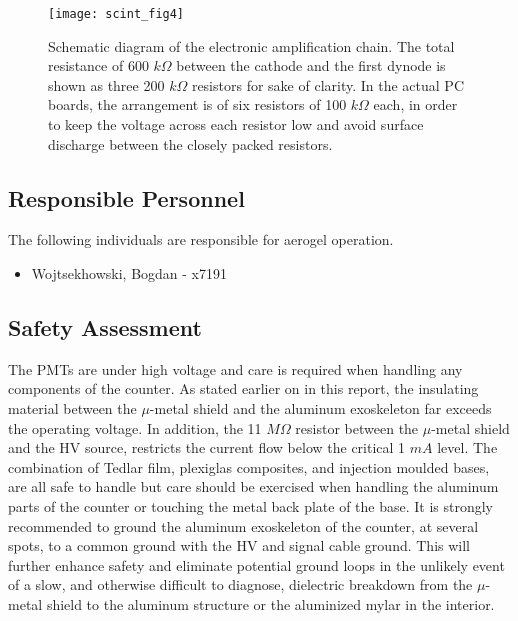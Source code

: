 %
%
\begin{figure}[p]
\texttt{[image: scint\_fig4]}
\caption[Aerogel: amplification chain]{
 Schematic diagram of the electronic amplification chain. The total 
 resistance of 600 $k\Omega$ between the cathode and the first dynode is shown 
 as three 200 $k\Omega$ resistors for sake of clarity. In the actual PC boards, 
 the arrangement is of six resistors of 100 $k\Omega$ each, in order to 
 keep the voltage across each resistor low and avoid surface discharge 
 between the closely packed resistors.
 }
\label{fig:aero_fig7}
\end{figure}

\subsection{Responsible Personnel} 
The following individuals are responsible for aerogel \Cerenkov operation. 
\begin{itemize}
\item[~]Wojtsekhowski, Bogdan - x7191 
\end{itemize} 
 
\subsection{Safety Assessment}

The PMTs are under high voltage and care is required when handling any 
components of the counter. As stated earlier on in this report, the insulating 
material between the $\mu$-metal shield and the aluminum exoskeleton far 
exceeds the operating voltage. In addition, the 11 $M\Omega$ resistor between 
the $\mu$-metal shield and the HV source, restricts the current flow below the  
critical 1 $mA$ level. The combination of Tedlar film, plexiglas composites, 
and injection moulded bases, are all safe to handle but care should be 
exercised when handling the aluminum parts of the counter or touching the metal 
back plate of the base. It is strongly recommended to ground the aluminum 
exoskeleton of the counter, at several spots, to a common ground with the HV 
and signal cable ground. This will further enhance safety and eliminate 
potential ground loops in the unlikely event of a slow, and otherwise difficult 
to diagnose, dielectric breakdown from the $\mu$-metal shield to the aluminum 
structure or the aluminized mylar in the interior.  


